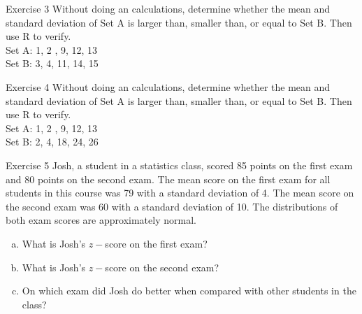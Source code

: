 \documentclass[10pt]{beamer}
\begin{document}
\begin{frame}{Exercise 3}
\vspace{-3cm}
Without doing an calculations, determine whether the mean and standard deviation of Set A is larger than, smaller than, or equal to Set B.  Then use R to verify.\\
\vspace{10pt}
\large
Set A: 1, 2 , 9, 12, 13\\
Set B: 3, 4, 11, 14, 15
\end{frame}

\begin{frame}{Exercise 4}
\vspace{-3cm}
Without doing an calculations, determine whether the mean and standard deviation of Set A is larger than, smaller than, or equal to Set B.  Then use R to verify.\\
\vspace{10pt}
\large
Set A: 1, 2 , 9, 12, 13\\
Set B: 2, 4, 18, 24, 26\\
\end{frame}

\begin{frame}{Exercise 5}
Josh, a student in a statistics class, scored 85 points on the first exam and 80 points on the second exam. The mean score on the first exam for all students in this course was 79 with a standard deviation of 4.  The mean score on the second exam was 60 with a standard deviation of 10.  The distributions of both exam scores are approximately normal.
\begin{enumerate}[(a)]
\item What is Josh's $z-$score on the first exam?
\vspace{1cm}
\item What is Josh's $z-$score on the second exam?
\vspace{1cm}
\item On which exam did Josh do better when compared with other students in the class?
\vspace{2cm}
\end{enumerate}
\end{frame}
\end{document}
